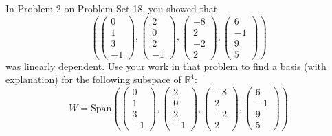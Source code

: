 \documentclass[12pt]{article}
\newenvironment{problem}[2][Problem]
{
	\begin{trivlist} 
		\item[\hskip \labelsep {\bfseries #1 #2:}]
	}
{
	\end{trivlist}
	}
\newenvironment{solution}[1][Solution]
{
	\begin{trivlist} 
		\item[\hskip \labelsep {\itshape #1:}]
	}
	{
	\end{trivlist}
}
\begin{document}
\newpage
\begin{problem}{5}
In Problem 2 on Problem Set 18, you showed that
\[
\left( \begin{pmatrix} 0\\1\\3\\-1 \end{pmatrix}, \begin{pmatrix} 2\\0\\2\\-1 \end{pmatrix}, \begin{pmatrix} -8\\2\\-2\\2 \end{pmatrix}, \begin{pmatrix} 6\\-1\\9\\5 \end{pmatrix} \right)
\]
was linearly dependent. Use your work in that problem to find a basis (with explanation) for the following subspace of $\mathbb{R}^4$:
\[
W=\text{Span}\left( \begin{pmatrix} 0\\1\\3\\-1 \end{pmatrix}, \begin{pmatrix} 2\\0\\2\\-1 \end{pmatrix}, \begin{pmatrix} -8\\2\\-2\\2 \end{pmatrix}, \begin{pmatrix} 6\\-1\\9\\5 \end{pmatrix} \right)
\] 
\noindent
\newline
\newline
\begin{solution}

\end{solution}
\end{problem}
\end{document}
